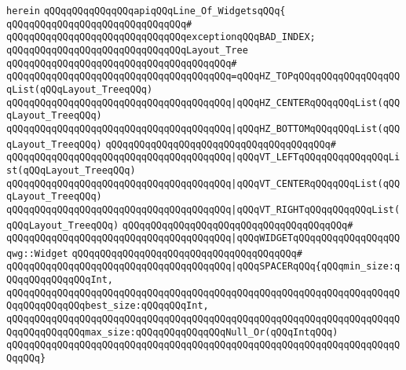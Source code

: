 \verb|herein|\newline
\newline
\verb|qQQqqQQqqQQqqQQqapiqQQqLine_Of_WidgetsqQQq{|\newline
\verb|qQQqqQQqqQQqqQQqqQQqqQQqqQQqqQQq#|\newline
\verb|qQQqqQQqqQQqqQQqqQQqqQQqqQQqqQQqexceptionqQQqBAD_INDEX;|\newline
\newline
\verb|qQQqqQQqqQQqqQQqqQQqqQQqqQQqqQQqLayout_Tree|\newline
\verb|qQQqqQQqqQQqqQQqqQQqqQQqqQQqqQQqqQQqqQQq#|\newline
\verb|qQQqqQQqqQQqqQQqqQQqqQQqqQQqqQQqqQQqqQQq=qQQqHZ_TOPqQQqqQQqqQQqqQQqqQQqList(qQQqLayout_TreeqQQq)|\newline
\verb|qQQqqQQqqQQqqQQqqQQqqQQqqQQqqQQqqQQqqQQq|\verb#|qQQqHZ_CENTERqQQqqQQqList(qQQqLayout_TreeqQQq)#\newline
\verb|qQQqqQQqqQQqqQQqqQQqqQQqqQQqqQQqqQQqqQQq|\verb#|qQQqHZ_BOTTOMqQQqqQQqList(qQQqLayout_TreeqQQq)#\newline
\verb|qQQqqQQqqQQqqQQqqQQqqQQqqQQqqQQqqQQqqQQq#|\newline
\verb|qQQqqQQqqQQqqQQqqQQqqQQqqQQqqQQqqQQqqQQq|\verb#|qQQqVT_LEFTqQQqqQQqqQQqqQQqList(qQQqLayout_TreeqQQq)#\newline
\verb|qQQqqQQqqQQqqQQqqQQqqQQqqQQqqQQqqQQqqQQq|\verb#|qQQqVT_CENTERqQQqqQQqList(qQQqLayout_TreeqQQq)#\newline
\verb|qQQqqQQqqQQqqQQqqQQqqQQqqQQqqQQqqQQqqQQq|\verb#|qQQqVT_RIGHTqQQqqQQqqQQqList(qQQqLayout_TreeqQQq)#\newline
\verb|qQQqqQQqqQQqqQQqqQQqqQQqqQQqqQQqqQQqqQQq#|\newline
\verb|qQQqqQQqqQQqqQQqqQQqqQQqqQQqqQQqqQQqqQQq|\verb#|qQQqWIDGETqQQqqQQqqQQqqQQqqQQqwg::Widget#\newline
\verb|qQQqqQQqqQQqqQQqqQQqqQQqqQQqqQQqqQQqqQQq#|\newline
\verb|qQQqqQQqqQQqqQQqqQQqqQQqqQQqqQQqqQQqqQQq|\verb#|qQQqSPACERqQQq{qQQqmin_size:qQQqqQQqqQQqqQQqInt,#\newline
\verb|qQQqqQQqqQQqqQQqqQQqqQQqqQQqqQQqqQQqqQQqqQQqqQQqqQQqqQQqqQQqqQQqqQQqqQQqqQQqqQQqqQQqbest_size:qQQqqQQqInt,|\newline
\verb|qQQqqQQqqQQqqQQqqQQqqQQqqQQqqQQqqQQqqQQqqQQqqQQqqQQqqQQqqQQqqQQqqQQqqQQqqQQqqQQqqQQqmax_size:qQQqqQQqqQQqqQQqNull_Or(qQQqIntqQQq)|\newline
\verb|qQQqqQQqqQQqqQQqqQQqqQQqqQQqqQQqqQQqqQQqqQQqqQQqqQQqqQQqqQQqqQQqqQQqqQQqqQQq}|\newline
